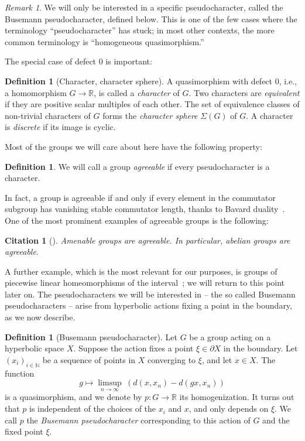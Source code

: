 \documentclass[10pt,a4paper]{article}
\theoremstyle{definition}
\newtheorem{defi}[cdrthm]{Definition}
\theoremstyle{remark}
\newtheorem{rema}[cdrthm]{Remark}
\newcommand{\N}{\mathbb{N}}
\newcommand{\R}{\mathbb{R}}
\theoremstyle{plain}
\newtheorem{cit}[cdrthm]{Citation}
\begin{document}
\begin{rema}
We will only be interested in a specific pseudocharacter, called the Busemann pseudocharacter, defined below. This is one of the few cases where the terminology ``pseudocharacter'' has stuck; in most other contexts, the more common terminology is ``homogeneous quasimorphism.''
\end{rema}

The special case of defect $0$ is important:

\begin{defi}[Character, character sphere]
A quasimorphism with defect $0$, i.e., a homomorphism $G \to \R$, is called a \emph{character} of $G$. Two characters are \emph{equivalent} if they are positive scalar multiples of each other. The set of equivalence classes of non-trivial characters of $G$ forms the \emph{character sphere} $\Sigma(G)$ of $G$. A character is \emph{discrete} if its image is cyclic.
\end{defi}

Most of the groups we will care about here have the following property:

\begin{defi}
We will call a group \emph{agreeable} if every pseudocharacter is a character.
\end{defi}

In fact, a group is agreeable if and only if every element in the commutator subgroup has vanishing stable commutator length, thanks to Bavard duality~\cite{bavard91}. One of the most prominent examples of agreeable groups is the following:

\begin{cit}[{\cite[Proposition~2.65]{scl}}]\label{amenable:agreeable}
Amenable groups are agreeable. In particular, abelian groups are agreeable.
\end{cit}

A further example, which is the most relevant for our purposes, is groups of piecewise linear homeomorphisms of the interval~\cite{calegari:PL}; we will return to this point later on. The pseudocharacters we will be interested in -- the so called Busemann pseudocharacters -- arise from hyperbolic actions fixing a point in the boundary, as we now describe.

\begin{defi}[Busemann pseudocharacter]
Let $G$ be a group acting on a hyperbolic space $X$. Suppose the action fixes a point $\xi\in\partial X$ in the boundary. Let $(x_i)_{i\in\N}$ be a sequence of points in $X$ converging to $\xi$, and let $x\in X$. The function
\[
g\mapsto \displaystyle \limsup_{n\to\infty} \hspace{3pt} (d(x,x_n) - d(gx,x_n))
\]
is a quasimorphism, and we denote by $p\colon G\to\R$ its homogenization. It turns out that $p$ is independent of the choices of the $x_i$ and $x$, and only depends on $\xi$. We call $p$ the \emph{Busemann pseudocharacter} corresponding to this action of $G$ and the fixed point $\xi$.
\end{defi}
\end{document}
